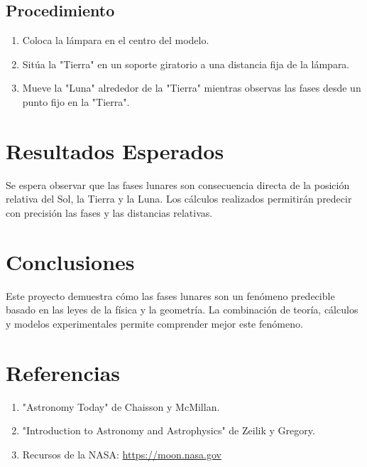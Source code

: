 \documentclass[12pt]{article}
\begin{document}
\subsection{Procedimiento}
\begin{enumerate}
    \item Coloca la lámpara en el centro del modelo.
    \item Sitúa la "Tierra" en un soporte giratorio a una distancia fija de la lámpara.
    \item Mueve la "Luna" alrededor de la "Tierra" mientras observas las fases desde un punto fijo en la "Tierra".
\end{enumerate}

\section{Resultados Esperados}
Se espera observar que las fases lunares son consecuencia directa de la posición relativa del Sol, la Tierra y la Luna. Los cálculos realizados permitirán predecir con precisión las fases y las distancias relativas.

\section{Conclusiones}
Este proyecto demuestra cómo las fases lunares son un fenómeno predecible basado en las leyes de la física y la geometría. La combinación de teoría, cálculos y modelos experimentales permite comprender mejor este fenómeno.

\section{Referencias}
\begin{enumerate}
    \item "Astronomy Today" de Chaisson y McMillan.
    \item "Introduction to Astronomy and Astrophysics" de Zeilik y Gregory.
    \item Recursos de la NASA: \url{https://moon.nasa.gov}
\end{enumerate}
\end{document}
